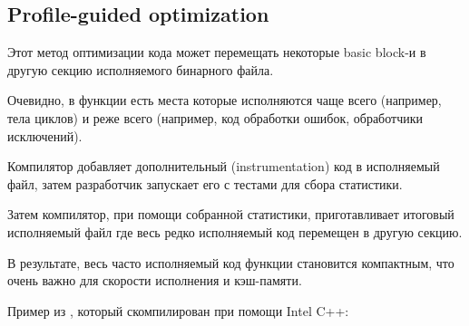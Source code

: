 

\subsection{Profile-guided optimization}
\label{PGO}

\myindex{\oracle}

Этот метод оптимизации кода может перемещать некоторые \gls{basic block}-и в другую секцию
исполняемого бинарного файла.

Очевидно, в функции есть места которые исполняются чаще всего (например, тела циклов)
и реже всего (например, код обработки ошибок, обработчики исключений).

Компилятор добавляет дополнительный (instrumentation) код в исполняемый файл,
затем разработчик запускает его с тестами для сбора статистики.

Затем компилятор, при помощи собранной статистики, приготавливает итоговый исполняемый
файл где весь редко исполняемый код перемещен в другую секцию.

В результате, весь часто исполняемый код функции становится компактным, что очень важно для скорости
исполнения и кэш-памяти.

Пример из \oracle, который скомпилирован при помощи Intel C++:

